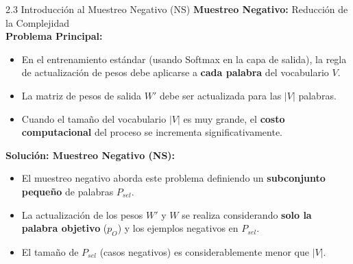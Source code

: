 \documentclass{beamer}
\begin{document}
\begin{frame}{2.3 Introducción al Muestreo Negativo (NS)}
	\textbf{Muestreo Negativo: } Reducción de la Complejidad\\
	\textbf{Problema Principal:}\\
	\begin{itemize}
		\item En el entrenamiento estándar (usando Softmax en la capa de salida), la regla de actualización de pesos debe aplicarse a \textbf{cada palabra} del vocabulario $V$.
		\item La matriz de pesos de salida $W'$ debe ser actualizada para las $|V|$ palabras.
		\item Cuando el tamaño del vocabulario $|V|$ es muy grande, el \textbf{costo computacional} del proceso se incrementa significativamente.
	\end{itemize}
	
	\textbf{Solución: Muestreo Negativo (NS):}\\
	
	\begin{itemize}
		\item El muestreo negativo aborda este problema definiendo un \textbf{subconjunto pequeño} de palabras $P_{sel}$.
		\item La actualización de los pesos $W'$ y $W$ se realiza considerando \textbf{solo la palabra objetivo} ($p_O$) y los ejemplos negativos en $P_{sel}$.
		\item El tamaño de $P_{sel}$ (casos negativos) es considerablemente menor que $|V|$.

	\end{itemize}
	
\end{frame}	
	
	
	
\end{document}
